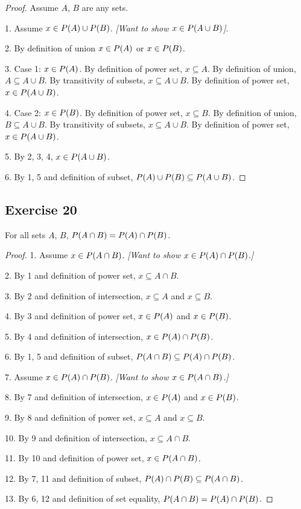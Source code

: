 \documentclass[14pt]{extarticle}
\let\mathscr\relax
\newcommand{\ps}{\mathscr{P}}
\begin{document}
\begin{proof}
Assume $A$, $B$ are any sets.

1. Assume \(x \in \ps(A) \cup \ps(B)\). {\it [Want to show \(x \in \ps(A \cup B)\)]}.

2. By definition of union \(x \in \ps(A)\) or \(x \in \ps(B)\).

3. Case 1: \(x \in \ps(A)\). By definition of power set, \(x \subseteq A\). By definition of union, \(A \subseteq A 
\cup B\). By transitivity of subsets, \(x \subseteq A \cup B\). By definition of power set, \(x \in \ps(A \cup B)\).

4. Case 2: \(x \in \ps(B)\). By definition of power set, \(x \subseteq B\). By definition of union, \(B \subseteq A 
\cup B\). By transitivity of subsets, \(x \subseteq A \cup B\). By definition of power set, \(x \in \ps(A \cup B)\).

5. By 2, 3, 4, \(x \in \ps(A \cup B)\).

6. By 1, 5 and definition of subset, \(\ps(A) \cup \ps(B) \subseteq \ps(A \cup B)\).
\end{proof}

\subsection{Exercise 20}
For all sets $A$, $B$, \(\ps(A \cap B) = \ps(A) \cap \ps(B)\).

\begin{proof}
1. Assume \(x \in \ps(A \cap B)\). {\it [Want to show \(x \in \ps(A) \cap \ps(B)\).]}

2. By 1 and definition of power set, \(x \subseteq A \cap B\).

3. By 2 and definition of intersection, \(x \subseteq A\) and \(x \subseteq B\).

4. By 3 and definition of power set, \(x \in \ps(A)\) and \(x \in \ps(B)\).

5. By 4 and definition of intersection, \(x \in \ps(A) \cap \ps(B)\).

6. By 1, 5 and definition of subset, \(\ps(A \cap B) \subseteq \ps(A) \cap \ps(B)\).

7. Assume \(x \in \ps(A) \cap \ps(B)\). {\it [Want to show \(x \in \ps(A \cap B)\).]}

8. By 7 and definition of intersection, \(x \in \ps(A)\) and \(x \in \ps(B)\).

9. By 8 and definition of power set, \(x \subseteq A\) and \(x \subseteq B\).

10. By 9 and definition of intersection, \(x \subseteq A \cap B\).

11. By 10 and definition of power set, \(x \in \ps(A \cap B)\).

12. By 7, 11 and definition of subset, \(\ps(A) \cap \ps(B) \subseteq \ps(A \cap B)\).

13. By 6, 12 and definition of set equality, \(\ps(A \cap B) = \ps(A) \cap \ps(B)\).
\end{proof}
\end{document}
